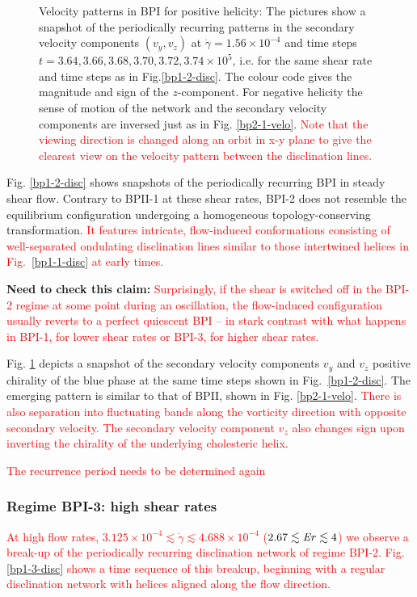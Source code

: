 \documentclass[8.5pt,twoside,twocolumn]{article}
\newcommand{\e}[1]{\times10^{#1}}
\newcommand{\gd}{\dot{\gamma}}
\newcommand{\com}[1]{{\bf {#1}}}
\newcommand{\rev}[1]{{\textcolor{red}{#1}}}
\begin{document}
\begin{figure}[htpb]
\caption{Velocity patterns in BPI for positive helicity: 
The pictures show a snapshot of the periodically recurring patterns in the 
secondary velocity components $(v_y,v_z)$ at $\gd=1.56\e{-4}$ and time steps 
$t=3.64, 3.66,3.68,3.70,3.72,3.74\e{5}$, i.e. for the same shear rate
and time steps as in Fig.\ref{bp1-2-disc}. The colour code gives the magnitude and sign 
of the $z$-component. For negative helicity the sense of motion of the 
network and the secondary velocity components are inversed just as in Fig. \ref{bp2-1-velo}. 
\rev{
Note that the viewing direction is changed along an orbit in x-y plane
 to give the clearest view on the velocity pattern between
the disclination lines.
}
}
\label{bp1-2-velo}
\end{figure}

Fig. \ref{bp1-2-disc} shows snapshots of the periodically recurring 
BPI in steady shear flow. Contrary to BPII-1 at these shear rates, 
BPI-2 does not resemble the equilibrium configuration
undergoing a homogeneous topology-conserving 
transformation. 
\rev{
It features intricate, flow-induced 
conformations consisting of well-separated ondulating 
disclination lines similar to those intertwined helices 
in Fig.~\ref{bp1-1-disc} at early times.
}

\com{Need to check this claim:} 
\rev{
Surprisingly, if the shear is switched off in
the BPI-2 regime at some point during an oscillation, 
the flow-induced configuration usually
reverts to a perfect quiescent BPI -- in stark contrast with
what happens in BPI-1, for lower shear rates or BPI-3, for higher shear rates. 
}

Fig. \ref{bp1-2-velo} depicts a snapshot of the secondary velocity 
components $v_y$ and $v_z$ positive chirality of
the blue phase at the same time steps shown in Fig.~\ref{bp1-2-disc}. 
The emerging pattern is similar to that of BPII, shown in
Fig. \ref{bp2-1-velo}. 
\rev{
There is also separation into fluctuating bands 
along the vorticity direction with opposite secondary velocity.
The secondary velocity component $v_z$ also changes sign upon
inverting the chirality of the underlying cholesteric helix.} 

\rev{The recurrence period needs to be determined again 
}


\subsubsection{Regime BPI-3: high shear rates }

\rev{
At high flow rates, $3.125\e{-4}\lesssim\gd\lesssim4.688\e{-4}$ 
($2.67\lesssim {\it Er}\lesssim 4$) we observe a break-up of the 
periodically recurring disclination network of regime BPI-2. 
Fig. \ref{bp1-3-disc} shows a time sequence of this breakup, beginning
with a regular disclination network with helices aligned along the 
flow direction.
}
\end{document}
